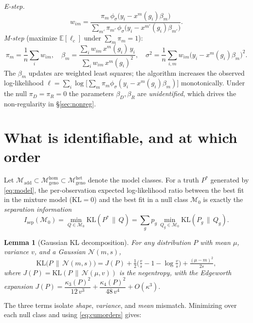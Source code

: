 \documentclass[11pt]{article}
\newtheorem{lemma}{Lemma}
\newcommand{\E}{\mathbb{E}}
\newcommand{\KL}{\mathrm{KL}}
\newcommand{\N}{\mathcal{N}}
\begin{document}
\noindent\emph{E-step.}
\begin{equation}
w_{im}=\frac{\pi_m\,\phi_\sigma\!\big(y_i-x^m(g_i)\beta_m\big)}
{\sum_{m'}\pi_{m'}\,\phi_\sigma\!\big(y_i-x^{m'}(g_i)\beta_{m'}\big)}.
\end{equation}
\noindent\emph{M-step} (maximize $\E[\ell_c]$ under $\sum_m\pi_m=1$):
\begin{equation}
\pi_m=\frac1n\sum_i w_{im},\quad
\beta_m=\frac{\sum_i w_{im}\,x^m(g_i)\,y_i}{\sum_i w_{im}\,x^m(g_i)^2},\quad
\sigma^2=\frac1n\sum_{i,m}w_{im}\big(y_i-x^m(g_i)\beta_m\big)^2.
\end{equation}
The $\beta_m$ updates are weighted least squares; the algorithm increases the
observed log-likelihood $\ell=\sum_i\log\big[\sum_m\pi_m\phi_\sigma(y_i-x^m(g_i)\beta_m)\big]$
monotonically. Under the null $\pi_D=\pi_R=0$ the parameters $\beta_D,\beta_R$
are \emph{unidentified}, which drives the non-regularity in \S\ref{sec:nonreg}.

\section{What is identifiable, and at which order}
Let $\mathcal M_{\mathrm{add}}\subset\mathcal M_{\mathrm{geno}}^{\mathrm{hom}}
\subset\mathcal M_{\mathrm{geno}}^{\mathrm{het}}$ denote the model classes. For a
truth $P^\ast$ generated by \eqref{eq:model}, the per-observation expected
log-likelihood ratio between the best fit in the mixture model
($\KL=0$) and the best fit in a null class $\mathcal M_0$ is exactly the
\emph{separation information}
\begin{equation}
I_{\mathrm{sep}}(\mathcal M_0)=\min_{Q\in\mathcal M_0}\KL(P^\ast\,\|\,Q)
=\sum_g p_g\,\min_{Q_g\in\mathcal M_0}\KL(P_g\,\|\,Q_g).
\end{equation}

\begin{lemma}[Gaussian KL decomposition]\label{lem:decomp}
For any distribution $P$ with mean $\mu$, variance $v$, and a Gaussian $\N(m,s)$,
\[
\KL\big(P\,\|\,\N(m,s)\big)=J(P)+\tfrac12\Big(\tfrac{v}{s}-1-\log\tfrac{v}{s}\Big)
+\tfrac{(\mu-m)^2}{2s},
\]
where $J(P)=\KL(P\,\|\,\N(\mu,v))$ is the negentropy, with the Edgeworth expansion
$J(P)=\dfrac{\kappa_3(P)^2}{12\,v^3}+\dfrac{\kappa_4(P)^2}{48\,v^4}+O(\kappa^3).$
\end{lemma}
\noindent The three terms isolate \emph{shape}, \emph{variance}, and \emph{mean}
mismatch. Minimizing over each null class and using \eqref{eq:cumorders} gives:
\end{document}
